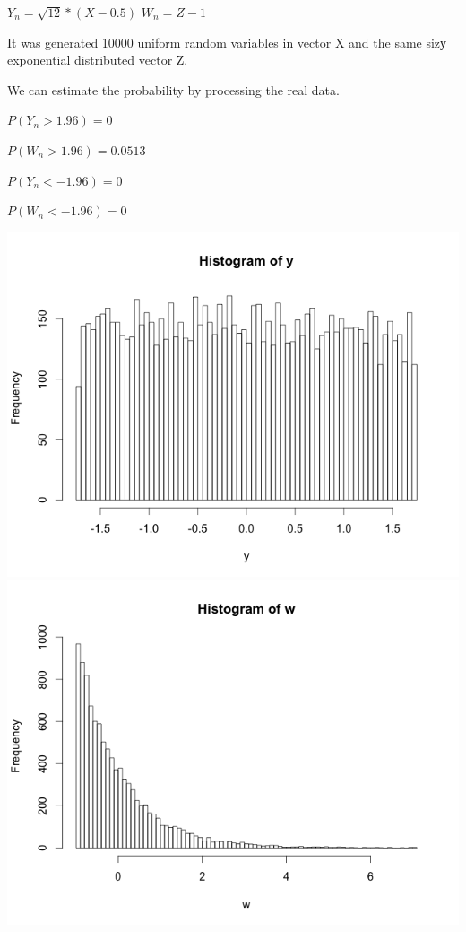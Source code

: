 \documentclass[12pt]{article}
\begin{document}
\begin{list}{()~}{}
\item

$Y_n = \sqrt{12}*(X-0.5)$
$W_n = Z - 1$

It was generated 10000 uniform random variables in vector X and the same sizу exponential distributed vector Z.

We can estimate the probability by processing the real data.

$P(Y_n > 1.96) = 0$

$P(W_n > 1.96) = 0.0513$

$P(Y_n < -1.96) = 0$

$P(W_n < -1.96) = 0$ 

\includegraphics[width=1\textwidth]{Rplot.png}
\includegraphics[width=1\textwidth]{Rplot04.png}


\end{list}
\end{document}
